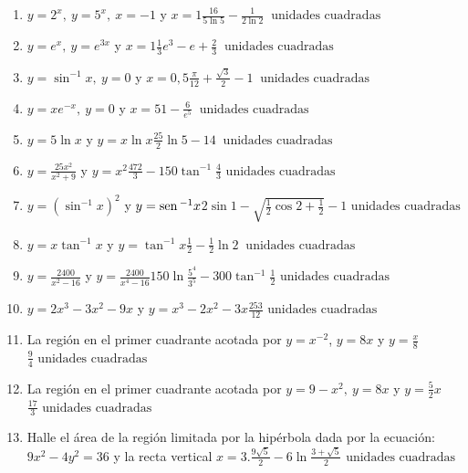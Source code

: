 {\begin{enumerate}
\item {$y=2^{x},\ y=5^{x},\ x=-1$ y $x=1$}{$\frac{16}{5\ln 5}-\frac{1}{2\ln 2}\ \text{ unidades cuadradas}$}

\item {$y=e^{x},\ y=e^{3x}$ y $x=1$}{$\frac{1}{3}e^{3}-e+\frac{2}{3}\ \text{ unidades cuadradas}$}%

\item {$y=\sin ^{-1}x,\ y=0$ y $x=0,5$}{$\frac{\pi }{12}+\frac{\sqrt{3}}{2}-1\ \text{ unidades cuadradas}$}

\item {$y=xe^{-x},\ y=0$ y $x=5$}{$1-\frac{6}{e^{5}}\ \text{ unidades cuadradas}$}

\item {$y=5\ln x$ y $y=x\ln x$}{$\frac{25}{2}\ln 5-14\ \text{ unidades cuadradas}$}

\item {$y=\frac{25x^{2}}{x^{2}+9}$ y $y=x^{2}$}{$\frac{472}{3}-150\tan^{-1} \frac{4}{3} \text{ unidades cuadradas}$}

\item {$y=(\sin^{-1}x)^2$ y $y=\text{\rm sen}\,^{-1} x$}{$2\sin 1-\sqrt{\frac{1}{2}\cos 2+\frac{1}{2}}-1  \text{ unidades cuadradas}$}

\item { $y=x\tan^{-1}x$ y $y=\tan^{-1} x$}{$\frac{1}{2}-\frac{1}{2}\ln 2\ \text{ unidades cuadradas}$}

\item {$y=\frac{2400}{x^{2}-16}$ y $y=\frac{2400}{x^{4}-16}$}{$150\ln \frac{5^4}{3^5}-300\tan^{-1} \frac{1}{2} \text{ unidades cuadradas}$}

\item {$y=2x^{3}-3x^{2}-9x$ y $ y=x^{3}-2x^{2}-3x$}{$\frac{253}{12}\text{ unidades cuadradas}$ }

\item {La región en el primer cuadrante acotada por $y=x^{-2}$, $y=8x$ y $y=\frac{x}{8}$}{$\frac{9}{4}\text{ unidades cuadradas}$}

\item {La región en el primer cuadrante acotada por $y=9-x^{2},\ y=8x$ y $y=\frac{5}{2}x$}{$\frac{17}{3}\text{ unidades cuadradas}$}

\item {Halle el área de la región limitada por la hipérbola dada por la ecuación: $9x^{2}-4y^{2}=36$ y la recta vertical $x=3.$}{$\frac{9\sqrt{5}}{2}-6\ln \frac{3+\sqrt{5}}{2}\text{ unidades cuadradas}$}
\label{areafinal}
\end{enumerate}
}

